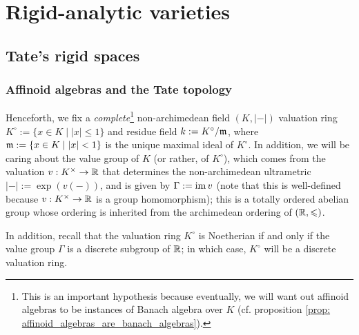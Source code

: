 \section{Rigid-analytic varieties}
    \subsection{Tate's rigid spaces}
        \subsubsection{Affinoid algebras and the Tate topology}
            \begin{convention}
                Henceforth, we fix a \textit{complete}\footnote{This is an important hypothesis because eventually, we will want out affinoid algebras to be instances of Banach algebra over $K$ (cf. proposition \ref{prop: affinoid_algebras_are_banach_algebras}).} non-archimedean field $(K, |-|)$ valuation ring $K^{\circ} := \{x \in K \mid |x| \leq 1\}$ and residue field $k := K^{\circ}/\mathfrak{m}$, where $\mathfrak{m} := \{x \in K \mid |x| < 1\}$ is the unique maximal ideal of $K^{\circ}$. In addition, we will be caring about the value group of $K$ (or rather, of $K^{\circ}$), which comes from the valuation $v: K^{\x} \to \R$ that determines the non-archimedean ultrametric $|-| := \exp(v(-))$, and is given by $\Gamma := \operatorname{im} v$ (note that this is well-defined because $v: K^{\x} \to \R$ is a group homomorphism); this is a totally ordered abelian group whose ordering is inherited from the archimedean ordering of $(\mathbb{R}, \leqslant)$.
            \end{convention}
            \begin{remark}
                In addition, recall that the valuation ring $K^{\circ}$ is Noetherian if and only if the value group $\Gamma$ is a discrete subgroup of $\mathbb{R}$; in which case, $K^{\circ}$ will be a discrete valuation ring.
            \end{remark}
            
